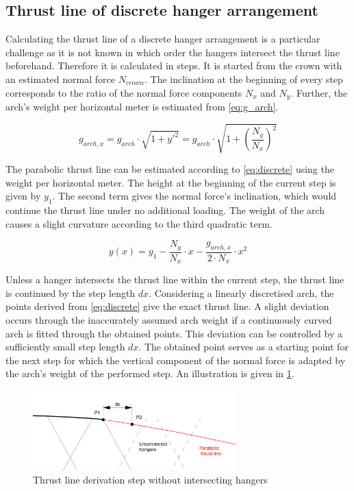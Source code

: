 \subsection{Thrust line of discrete hanger arrangement} \label{app:discrete}

Calculating the thrust line of a discrete hanger arrangement is a particular challenge as it is not known in which order the hangers intersect the thrust line beforehand. Therefore it is calculated in steps. It is started from the crown with an estimated normal force $N_{crown}$. The inclination at the beginning of every step corresponds to the ratio of the normal force components $N_x$ and $N_y$. Further, the arch's weight per horizontal meter is estimated from \cref{eq:g_arch}.

\begin{equation}
    g_{arch,x} = g_{arch} \cdot \sqrt{1+y'^2} = g_{arch} \cdot \sqrt{1+\left( \frac{N_{y}}{N_{x}} \right)^2}
    \label{eq:g_arch}
\end{equation}

The parabolic thrust line can be estimated according to \cref{eq:discrete} using the weight per horizontal meter. The height at the beginning of the current step is given by $y_1$. The second term gives the normal force's inclination, which would continue the thrust line under no additional loading. The weight of the arch causes a slight curvature according to the third quadratic term.

\begin{equation}
    y(x) = y_1 - \frac{N_y}{N_x} \cdot x - \frac{g_{arch,x}}{2\cdot N_x}\cdot x^2
    \label{eq:discrete}
\end{equation}

Unless a hanger intersects the thrust line within the current step, the thrust line is continued by the step length $dx$. Considering a linearly discretised arch, the points derived from \cref{eq:discrete} give the exact thrust line. A slight deviation occurs through the inaccurately assumed arch weight if a continuously curved arch is fitted through the obtained points. This deviation can be controlled by a sufficiently small step length $dx$. The obtained point serves as a starting point for the next step for which the vertical component of the normal force is adapted by the arch's weight of the performed step. An illustration is given in \cref{fig:discrete_1}.

\begin{figure}[H]
    \centering
    \includegraphics[width=0.7\textwidth]{overleaf/Appendix/Pictures/discrete_thrust_line_1.PNG}
    \caption{Thrust line derivation step without intersecting hangers}
    \label{fig:discrete_1}
\end{figure}

